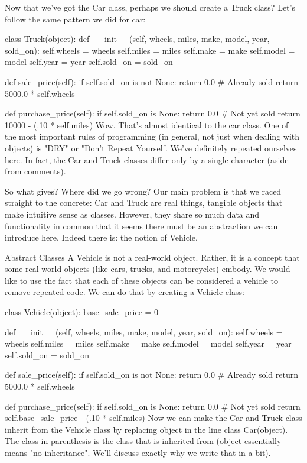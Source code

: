 Now that we've got the Car class, perhaps we should create a Truck class? Let's follow the same pattern we did for car:

class Truck(object):
    def __init__(self, wheels, miles, make, model, year, sold_on):
        self.wheels = wheels
        self.miles = miles
        self.make = make
        self.model = model
        self.year = year
        self.sold_on = sold_on

    def sale_price(self):
        if self.sold_on is not None:
            return 0.0  # Already sold
        return 5000.0 * self.wheels

    def purchase_price(self):
        if self.sold_on is None:
            return 0.0  # Not yet sold
        return 10000 - (.10 * self.miles)
Wow. That's almost identical to the car class. One of the most important rules of programming (in general, not just when dealing with objects) is "DRY" or "Don't Repeat Yourself. We've definitely repeated ourselves here. In fact, the Car and Truck classes differ only by a single character (aside from comments).

So what gives? Where did we go wrong? Our main problem is that we raced straight to the concrete: Car and Truck are real things, tangible objects that make intuitive sense as classes. However, they share so much data and functionality in common that it seems there must be an abstraction we can introduce here. Indeed there is: the notion of Vehicle.

Abstract Classes
A Vehicle is not a real-world object. Rather, it is a concept that some real-world objects (like cars, trucks, and motorcycles) embody. We would like to use the fact that each of these objects can be considered a vehicle to remove repeated code. We can do that by creating a Vehicle class:

class Vehicle(object):
    base_sale_price = 0

    def __init__(self, wheels, miles, make, model, year, sold_on):
        self.wheels = wheels
        self.miles = miles
        self.make = make
        self.model = model
        self.year = year
        self.sold_on = sold_on


    def sale_price(self):
        if self.sold_on is not None:
            return 0.0  # Already sold
        return 5000.0 * self.wheels

    def purchase_price(self):
        if self.sold_on is None:
            return 0.0  # Not yet sold
        return self.base_sale_price - (.10 * self.miles)
Now we can make the Car and Truck class inherit from the Vehicle class by replacing object in the line class Car(object). The class in parenthesis is the class that is inherited from (object essentially means "no inheritance". We'll discuss exactly why we write that in a bit).

